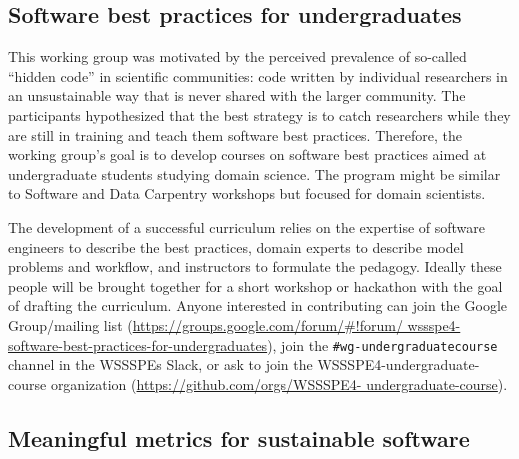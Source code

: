 \documentclass[11pt, oneside]{amsart}
\newcommand{\note}[1]{ {\textcolor{blueish}    { ***Note:      #1 }}}
\begin{document}
\subsection{Software best practices for undergraduates}
\label{sec:best-practices-undergrads}


This working group was motivated by the perceived prevalence of
so-called ``hidden code'' in scientific communities: code written by
individual researchers in an unsustainable way that is never shared
with the larger community. 
%
The participants hypothesized that the best strategy is to catch
researchers while they are still in training and teach them software
best practices. Therefore, the working group's goal
is to develop courses on software best practices aimed at
undergraduate students studying domain science. The program might be
similar to Software and Data Carpentry workshops but
focused for domain scientists.

The development of a successful curriculum relies on the expertise of
software engineers to describe the best practices, domain experts to
describe model problems and workflow, and instructors to formulate
the pedagogy. Ideally these people will be brought together for a
short workshop or hackathon with the goal of drafting the
curriculum. 
Anyone interested in contributing can join the Google Group/mailing list (\url{https://groups.google.com/forum/#!forum/
wssspe4-software-best-practices-for-undergraduates}), 
join the \texttt{\#wg-undergraduatecourse} channel in the WSSSPEs Slack,
or ask to join the WSSSPE4-undergraduate-course organization (\url{https://github.com/orgs/WSSSPE4-
undergraduate-course}).


\subsection{Meaningful metrics for sustainable software}
\label{sec:metrics}

\end{document}
